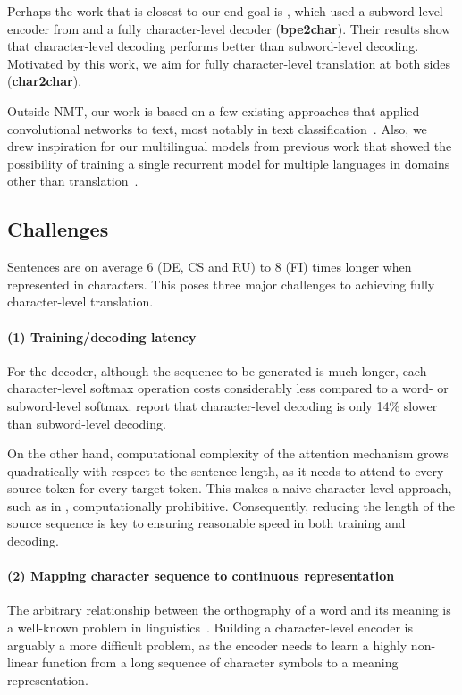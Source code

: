 \documentclass[11pt,letterpaper]{article}
\newcommand{\tb}{\textbf}
\begin{document}
    Perhaps the work that is closest to our end goal is \cite{Chung:16}, which used a subword-level encoder from \cite{Sennrich:15} and a fully character-level decoder (\tb{bpe2char}). Their results show that character-level decoding performs better than subword-level decoding. Motivated by this work, we aim for fully character-level translation at both sides (\tb{char2char}).

    Outside NMT, our work is based on a few existing approaches that applied convolutional networks to text, most notably in text classification~\cite{Zhang:15,Xiao:16}. Also, we drew inspiration for our multilingual models from previous work that showed the possibility of training a single recurrent model for multiple languages in domains other than translation~\cite{Tsvetkov:16,Gillick:15}.
    
    \subsection{Challenges}
    
    Sentences are on average 6 (DE, CS and RU) to 8 (FI) times longer when represented in characters. This poses three major challenges to achieving fully character-level translation.
    
    \paragraph{(1) Training/decoding latency} For the decoder, although the sequence to be generated is much longer, each character-level softmax operation costs considerably less compared to a word- or subword-level softmax.  report that character-level decoding is only 14\% slower than subword-level decoding. 

    On the other hand, computational complexity of the attention mechanism grows quadratically with respect to the sentence length, as it needs to attend to every source token for every target token. This makes a naive character-level approach, such as in \cite{Luong:16}, computationally prohibitive. Consequently, reducing the length of the source sequence is key to ensuring reasonable speed in both training and decoding. 
    
    \paragraph{(2) Mapping character sequence to continuous representation} The arbitrary relationship between the orthography of a word and its meaning is a well-known problem in linguistics~\cite{deSaussure:1916}. Building a character-level encoder is arguably a more difficult problem, as the encoder needs to learn a highly non-linear function from a long sequence of character symbols to a meaning representation. 
    
\end{document}
